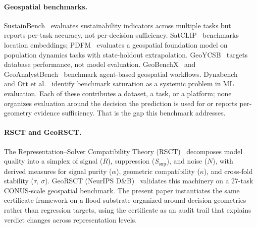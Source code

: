 \paragraph{Geospatial benchmarks.}
SustainBench~\cite{yeh2021sustainbench} evaluates sustainability
indicators across multiple tasks but reports per-task accuracy, not
per-decision sufficiency. SatCLIP~\cite{klemmer2023satclip} benchmarks
location embeddings; PDFM~\cite{agarwal2025pdfm} evaluates a
geospatial foundation model on population dynamics tasks with
state-holdout extrapolation. GeoYCSB~\cite{kim2023geoycsb} targets
database performance, not model evaluation.
GeoBenchX~\cite{krechetova2025geobenchx} and
GeoAnalystBench~\cite{zhang2025geoanalyst} benchmark agent-based
geospatial workflows. Dynabench~\cite{kiela2021dynabench} and
Ott et al.~\cite{ott2022saturation} identify benchmark saturation
as a systemic problem in ML evaluation. Each of these contributes a
dataset, a task, or a platform; none organizes evaluation around the
decision the prediction is used for or reports per-geometry evidence
sufficiency. That is the gap this benchmark addresses.

\paragraph{RSCT and GeoRSCT.}
The Representation--Solver Compatibility Theory
(RSCT)~\cite{martin2026rsct} decomposes model quality into a simplex
of signal ($R$), suppression ($S_\text{sup}$), and noise ($N$), with
derived measures for signal purity ($\alpha$), geometric compatibility
($\kappa$), and cross-fold stability ($\tau$, $\sigma$). GeoRSCT
(NeurIPS D\&B)~\cite{martin2026georsct} validates this machinery on a
27-task CONUS-scale geospatial benchmark. The present paper instantiates
the same certificate framework on a flood substrate organized around
decision geometries rather than regression targets, using the
certificate as an audit trail that explains verdict changes across
representation levels.
